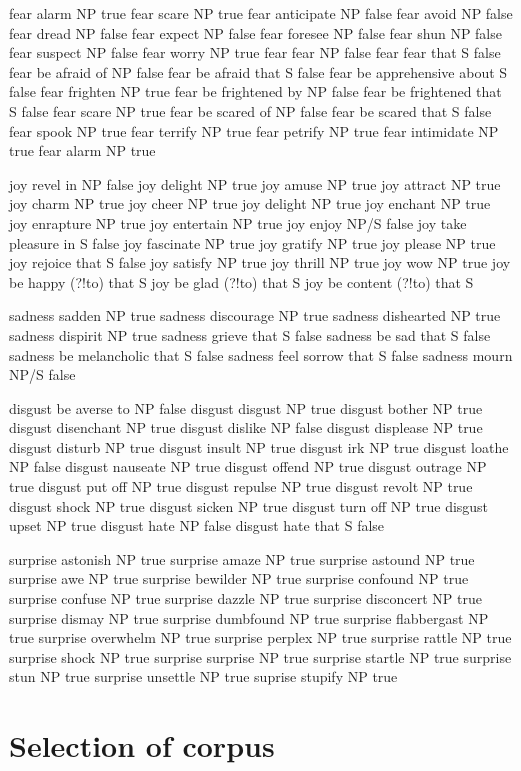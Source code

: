 fear	alarm	NP	true
fear	scare	NP	true
fear	anticipate	NP	false
fear	avoid	NP	false
fear	dread	NP	false
fear	expect	NP	false
fear	foresee	NP	false
fear	shun	NP	false
fear	suspect	NP	false
fear	worry	NP	true
fear	fear	NP	false
fear	fear that	S	false
fear	be afraid of	NP	false
fear	be afraid that	S	false
fear	be apprehensive about	S	false
fear	frighten	NP	true
fear	be frightened by	NP	false
fear	be frightened that	S	false
fear	scare	NP	true
fear	be scared of	NP	false
fear	be scared that	S	false
fear	spook	NP	true
fear	terrify	NP	true
fear	petrify	NP	true
fear	intimidate	NP	true
fear	alarm	NP	true

joy	revel in	NP	false
joy	delight	NP	true
joy	amuse	NP	true
joy	attract	NP	true
joy	charm	NP	true
joy	cheer	NP	true
joy	delight	NP	true
joy	enchant	NP	true
joy	enrapture	NP	true
joy	entertain	NP	true
joy	enjoy	NP/S	false
joy	take pleasure in	S	false
joy	fascinate	NP	true
joy	gratify	NP	true
joy	please	NP	true
joy	rejoice	that	S	false
joy	satisfy	NP	true
joy	thrill	NP	true
joy	wow	NP	true
joy	be happy (?!to) that	S
joy	be glad (?!to) that	S
joy	be content (?!to) that	S


sadness	sadden	NP	true
sadness	discourage	NP	true
sadness	dishearted	NP	true
sadness	dispirit	NP	true
sadness	grieve that S	false
sadness	be sad that	S	false
sadness	be melancholic that	S	false
sadness	feel sorrow that	S	false
sadness	mourn	NP/S	false

disgust	be averse to	NP	false
disgust	disgust	NP	true
disgust	bother	NP	true
disgust	disenchant	NP	true
disgust	dislike	NP	false
disgust	displease	NP	true
disgust	disturb	NP	true
disgust	insult	NP	true
disgust	irk	NP	true
disgust	loathe	NP	false
disgust	nauseate	NP	true
disgust	offend	NP	true
disgust	outrage	NP	true
disgust	put off	NP	true
disgust	repulse	NP	true
disgust	revolt	NP	true
disgust	shock	NP	true
disgust	sicken	NP	true
disgust	turn off	NP	true
disgust	upset	NP	true
disgust	hate	NP	false
disgust	hate that	S	false

surprise	astonish	NP	true
surprise	amaze	NP	true
surprise	astound	NP	true
surprise	awe	NP	true
surprise	bewilder	NP	true
surprise	confound	NP	true
surprise	confuse	NP	true
surprise	dazzle	NP	true
surprise	disconcert	NP	true
surprise	dismay	NP	true
surprise	dumbfound	NP	true
surprise	flabbergast	NP	true
surprise	overwhelm	NP	true
surprise	perplex	NP	true
surprise	rattle	NP	true
surprise	shock	NP	true
surprise	surprise	NP	true
surprise	startle	NP	true
surprise	stun	NP	true
surprise	unsettle	NP	true
suprise	stupify	NP	true

\section{Selection of corpus}

